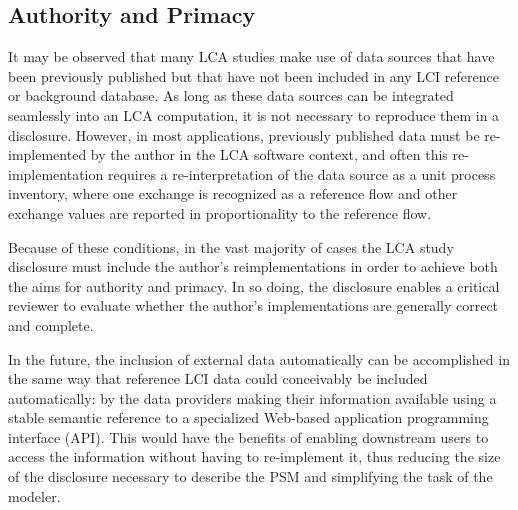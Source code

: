 \subsection{Authority and Primacy}

It may be observed that many LCA studies make use of data sources that have been previously published but that have not been included in any LCI reference or background database.  As long as these data sources can be integrated seamlessly into an LCA computation, it is not necessary to reproduce them in a disclosure.  However, in most applications, previously published data must be re-implemented by the author in the LCA software context, and often this re-implementation requires a re-interpretation of the data source as a unit process inventory, where one exchange is recognized as a reference flow and other exchange values are reported in proportionality to the reference flow.

Because of these conditions, in the vast majority of cases the LCA study disclosure must include the author's reimplementations in order to achieve both the aims for authority and primacy.  In so doing, the disclosure enables a critical reviewer to evaluate whether the author's implementations are generally correct and complete.

In the future, the inclusion of external data automatically can be accomplished in the same way that reference LCI data could conceivably be included automatically: by the data providers making their information available  using a stable semantic reference to a specialized Web-based application programming interface (API).  This would have the benefits of enabling downstream users to access the information without having to re-implement it, thus reducing the size of the disclosure necessary to describe the PSM and simplifying the task of the modeler.
